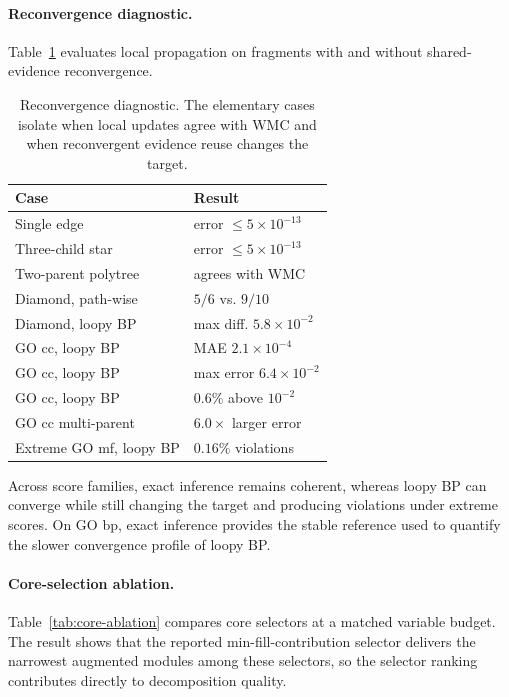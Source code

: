 \documentclass[letterpaper]{article}
\begin{document}
\paragraph{Reconvergence diagnostic.}
Table~\ref{tab:reconv} evaluates local propagation on fragments with and
without shared-evidence reconvergence.

\begin{table}[t]
\centering
\small
\setlength{\tabcolsep}{3pt}
\begin{tabular}{ll}
\toprule
Case & Result \\
\midrule
Single edge & error \(\le 5{\times}10^{-13}\) \\
Three-child star & error \(\le 5{\times}10^{-13}\) \\
Two-parent polytree & agrees with WMC \\
Diamond, path-wise & \(5/6\) vs. \(9/10\) \\
Diamond, loopy BP & max diff. \(5.8{\times}10^{-2}\) \\
GO cc, loopy BP & MAE \(2.1{\times}10^{-4}\) \\
GO cc, loopy BP & max error \(6.4{\times}10^{-2}\) \\
GO cc, loopy BP & \(0.6\%\) above \(10^{-2}\) \\
GO cc multi-parent & \(6.0{\times}\) larger error \\
Extreme GO mf, loopy BP & \(0.16\%\) violations \\
\bottomrule
\end{tabular}
\caption{Reconvergence diagnostic. The elementary cases isolate when
local updates agree with WMC and when reconvergent evidence reuse changes
the target.}
\label{tab:reconv}
\end{table}

Across score families, exact inference remains coherent, whereas loopy
BP can converge while still changing the target and producing violations
under extreme scores. On GO bp, exact inference provides the stable
reference used to quantify the slower convergence profile of loopy BP.

\paragraph{Core-selection ablation.}
Table~\ref{tab:core-ablation} compares core selectors at a matched
variable budget. The result shows that the reported
min-fill-contribution selector delivers the narrowest augmented modules
among these selectors, so the selector ranking contributes directly to
decomposition quality.
\end{document}
